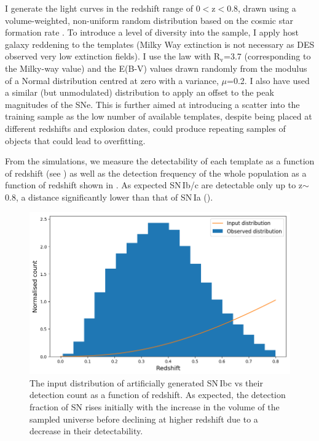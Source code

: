 I generate the light curves in the redshift range of 0$<$z$<$0.8, drawn using a volume-weighted, non-uniform random distribution based on the cosmic star formation rate  \citep{Hopkins2006}. To introduce a level of diversity into the sample, I apply host galaxy reddening to the templates (Milky Way extinction is not necessary as DES observed very low extinction fields). I use the \citet{Cardelli1989} law with R$_\mathrm{v}$=3.7 (corresponding to the Milky-way value) and the E(B-V) values drawn randomly from the modulus of a Normal distribution centred at zero with a variance, $\mu$=0.2. I also have used a similar (but unmodulated) distribution to apply an offset to the peak magnitudes of the SNe. This is further aimed at introducing a scatter into the training sample as the low number of available templates, despite being placed at different redshifts and explosion dates, could produce repeating samples of objects that could lead to overfitting.

From the simulations, we measure the detectability of each template as a function of redshift (see ) as well as the detection frequency of the whole population as a function of redshift shown in . As expected SN\,Ib/c are detectable only up to z$\sim$0.8, a distance significantly lower than that of SN\,Ia ().

\begin{figure}
  \includegraphics[width=\textwidth]{Figures/Chapter5/SNIbc_z_dist.png}
  \caption{The input distribution of artificially generated SN\,Ibc vs their detection count as a function of redshift. As expected, the detection fraction of SN rises initially with the increase in the volume of the sampled universe before declining at higher redshift due to a decrease in their detectability.}
  \label{fig:IbcDist}
\end{figure}

